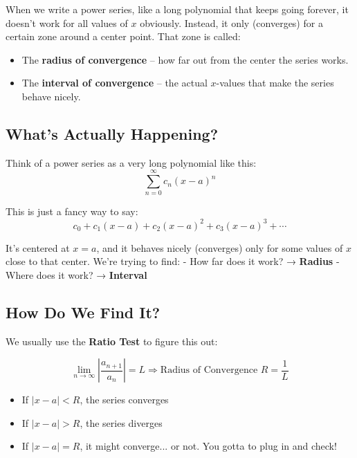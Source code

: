 \documentclass{article}
\begin{document}
\begin{tcolorbox}[colback=gray!8,colframe=black,title=Big Idea (How I like to understand this)]
When we write a power series, like a long polynomial that keeps going forever, it doesn’t work for all values of \(x\) obviously.  
Instead, it only (converges) for a certain zone around a center point. That zone is called:
\begin{itemize}
  \item The \textbf{radius of convergence} – how far out from the center the series works.
  \item The \textbf{interval of convergence} – the actual \(x\)-values that make the series behave nicely.
\end{itemize}
\end{tcolorbox}

\subsection*{What's Actually Happening?}

Think of a power series as a very long polynomial like this:
\[
\sum_{n=0}^{\infty} c_n (x - a)^n
\]

This is just a fancy way to say:
\[
c_0 + c_1(x - a) + c_2(x - a)^2 + c_3(x - a)^3 + \cdots
\]

It’s centered at \(x = a\), and it behaves nicely (converges) only for some values of \(x\) close to that center.  
We’re trying to find:
- How far does it work? → \textbf{Radius}
- Where does it work? → \textbf{Interval}

\subsection*{How Do We Find It?}

We usually use the \textbf{Ratio Test} to figure this out:

\[
\lim_{n \to \infty} \left| \frac{a_{n+1}}{a_n} \right| = L
\Rightarrow \text{Radius of Convergence } R = \frac{1}{L}
\]

\begin{tcolorbox}[colback=gray!10,colframe=black,title=Plain Rules]
\begin{itemize}
  \item If \( |x - a| < R \), the series converges 
  \item If \( |x - a| > R \), the series diverges 
  \item If \( |x - a| = R \), it might converge... or not. You gotta to plug in and check!
\end{itemize}
\end{tcolorbox}
\end{document}
